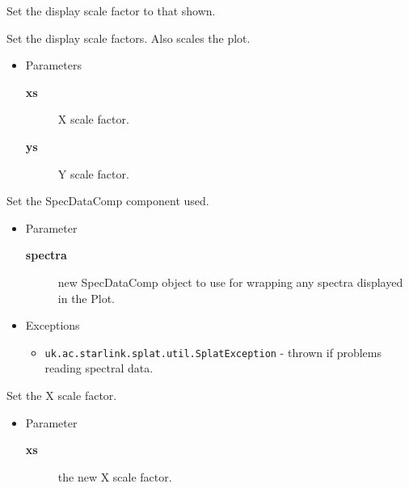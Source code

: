 \begin{desc}Set the display scale factor to that shown.
\end{desc}

\begin{desc}Set the display scale factors. Also scales the plot.
\begin{itemize}
\item{Parameters
  \begin{description}
   \item[\textbf{xs}]{X scale factor.}
   \item[\textbf{ys}]{Y scale factor.}
  \end{description}}
\end{itemize}
\end{desc}

\begin{desc}Set the SpecDataComp component used.
\begin{itemize}
\item{Parameter
  \begin{description}
   \item[\textbf{spectra}]{new SpecDataComp object to use for wrapping any
                spectra displayed in the Plot.}
  \end{description}}
\end{itemize}
\begin{itemize}
\item{{Exceptions}
  \begin{itemize}
   \item{\vspace{-.6ex}\texttt{uk.ac.starlink.splat.util.SplatException} - thrown if problems reading spectral
            data.}
  \end{itemize}
}
\end{itemize}
\end{desc}

\begin{desc}Set the X scale factor.
\begin{itemize}
\item{Parameter
  \begin{description}
   \item[\textbf{xs}]{the new X scale factor.}
  \end{description}}
\end{itemize}
\end{desc}

